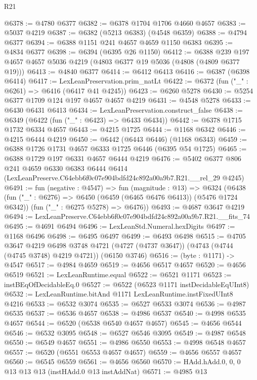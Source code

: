 \begin{lexlean}{R21}
\begin{coremodule}
@6378 := @4780 @6377
@6382 := @6378 @1704 @1706 @4660 @4657
@6383 := @5037 @4219
@6387 := @6382 (@5213 @6383) (@4548 @6359)
@6388 := @4794 @6377
@6394 := @6388 @1151 @241 @4657 @4659 @1150 @6383
@6395 := @4834 @6377
@6398 := @6394 (@6395 @26 @1150)
@6412 := @6388 @239 @197 @4657 @4657 @5036 @4219 (@4803 @6377 @19 @5036 (@4808 (@4809 @6377 @19)))
@6413 := @4840 @6377
@6414 := @6412 @6413
@6416 := @6387 (@6398 @6414)
@6417 := LexLeanPreservation.prim_natLt
@6422 := @6372 (fun ("_" : @6261) => @6416 (@6417 @41 @4245))
@6423 := @6260 @5278
@6430 := @5254 @6377 @1709 @124 @197 @4657 @4657 @4219
@6431 := @4548 @5278
@6433 := @6430 @6431 @6413
@6434 := LexLeanPreservation.construct_false
@6438 := @6349 (@6422 (fun ("_" : @6423) => @6433 @6434))
@6442 := @6378 @1715 @1732 @6334 @4657
@6443 := @4215 @1725
@6444 := @1168 @6342
@6446 := @4215 @6444 @4219
@6450 := @6442 (@6443 @6446) (@1168 @6343)
@6459 := @6388 @1726 @1731 @4657 @6333 @1725 @6446 (@6395 @54 @1725)
@6465 := @6388 @1729 @197 @6331 @4657 @6444 @4219
@6476 := @5402
    @6377
    @806
    @241
    @4659
    @6330
    @6383
    @6444
    @6414
    (LexLeanPreserve.C64ebb6f0c07e904bdfd24c892a00a9b7.R21.__rel_29 @4245)
@6491 := fun (negative : @4547) =>
  fun (magnitude : @13) =>
  @6324
    (@6438
      (fun ("_" : @6276) => @6450 (@6459 (@6465 @6476 @6413)) (@5476 @1724 @6342))
      (fun ("_" : @6275 @5278) => @6476))
@6493 := @4687 @3647 @4219
@6494 := LexLeanPreserve.C64ebb6f0c07e904bdfd24c892a00a9b7.R21.__fits_74
@6495 := @4691 @6494
@6496 := LexLeanStd.Numeral.hexDigits
@6497 := @1168 @6496
@6498 := @6495 @6497
@6499 := @6493 @6498
@6515 := @4705
    @3647
    @4219
    @6498
    @3748
    @4721
    (@4727 (@4737 @3647))
    (@4743 (@4744 (@4745 @3748) @4219 @4721))
    (@6150 @3746)
@6516 := (byte : @1171) -> @4547
@6517 := @4984 @4659
@6519 := @4656 @6517 @4657
@6520 := @4656 @6519
@6521 := LexLeanRuntime.equal
@6522 := @6521 @1171
@6523 := instBEqOfDecidableEq.{0}
@6527 := @6522 (@6523 @1171 instDecidableEqUInt8)
@6532 := LexLeanRuntime.bitAnd @1171 LexLeanRuntime.instFixedUInt8 @4216
@6533 := @6532 @3074
@6535 := @6527 @6533 @3074
@6536 := @4987 @6535
@6537 := @6536 @4657
@6538 := @4986 @6537
@6540 := @4998 @6535 @4657
@6544 := @6520 (@6538 @6540 @4657 @4657)
@6545 := @4656 @6544
@6546 := @6532 @3095
@6548 := @6527 @6546 @3095
@6549 := @4987 @6548
@6550 := @6549 @4657
@6551 := @4986 @6550
@6553 := @4998 @6548 @4657
@6557 := @6520 (@6551 @6553 @4657 @4657)
@6559 := @4656 @6557 @4657
@6560 := @6545 @6559
@6561 := @4656 @6560
@6570 := HAdd.hAdd.{0, 0, 0} @13 @13 @13 (instHAdd.{0} @13 instAddNat)
@6571 := @4985 @13

\end{coremodule}
\end{lexlean}
